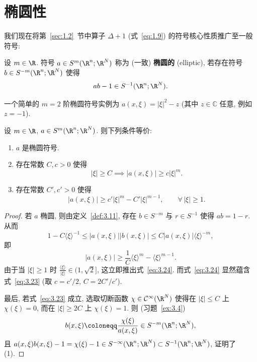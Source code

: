 \section{椭圆性}\label{sec:3.2}
%

我们现在将第~\ref{sec:1.2}~节中算子 $\Delta + 1$ (式~\eqref{eq:1.9}) 的符号核心性质推广至一般符号:

\begin{definition}[椭圆符号]\label{def:3.11}
设 $m \in \R$. 符号 $a \in S^m(\R^n; \R^N)$ 称为 (一致) \textbf{椭圆的} (elliptic), 若存在符号 $b \in S^{-m}(\R^n; \R^N)$ 使得
\[
    a b - 1 \in S^{-1}(\R^n; \R^N).
\]
\end{definition}

一个简单的 $m = 2$ 阶椭圆符号实例为 $a(x, \xi) = |\xi|^2 - z$ (其中 $z \in \mathbb{C}$ 任意, 例如 $z = -1$).

\begin{proposition}[椭圆性的等价刻画]\label{prop:3.12}
设 $m \in \R$, $a \in S^m(\R^n; \R^N)$. 则下列条件等价:
\begin{enumerate}
    \item $a$ 是椭圆符号.
    \item 存在常数 $C, c > 0$ 使得
    \begin{equation}\label{eq:3.23}
        |\xi| \ge C \implies |a(x, \xi)| \ge c |\xi|^m.
    \end{equation}
    \item 存在常数 $C', c' > 0$ 使得
    \begin{equation}\label{eq:3.24}
        |a(x, \xi)| \ge c' |\xi|^m - C' |\xi|^{m-1}, \qquad \forall\,|\xi| \ge 1.
    \end{equation}
\end{enumerate}
\end{proposition}

\begin{proof}
若 $a$ 椭圆, 则由定义~\ref{def:3.11}, 存在 $b \in S^{-m}$ 与 $r \in S^{-1}$ 使得 $a b = 1 - r$. 从而
\begin{equation}\label{eq:3.25}
    1 - C \langle \xi \rangle^{-1} \le |a(x, \xi)| |b(x, \xi)| \le C |a(x, \xi)| \langle \xi \rangle^{-m},
\end{equation}
即
\begin{equation}\label{eq:3.26}
    |a(x, \xi)| \ge \frac{1}{C} \langle \xi \rangle^m - \langle \xi \rangle^{m-1}.
\end{equation}
由于当 $|\xi| \ge 1$ 时 $\frac{\langle \xi \rangle}{|\xi|} \in (1, \sqrt{2}]$, 这立即推出式~\eqref{eq:3.24}. 而式~\eqref{eq:3.24} 显然蕴含式~\eqref{eq:3.23} (取 $c = c'/2$, $C = 2C'/c'$).

最后, 若式~\eqref{eq:3.23} 成立, 选取切断函数 $\chi \in \Smooth(\R^N)$ 使得在 $|\xi| \le C$ 上 $\chi(\xi) = 0$, 而在 $|\xi| \ge 2C$ 上 $\chi(\xi) = 1$. 则 (习题~\ref{ex:3.4})
\begin{equation}\label{eq:3.27}
    b(x, \xi) \defeq \frac{\chi(\xi)}{a(x, \xi)} \in S^{-m}(\R^n; \R^N),
\end{equation}
且 $a(x, \xi) b(x, \xi) - 1 = \chi(\xi) - 1 \in S^{-\infty}(\R^n; \R^N) \subset S^{-1}(\R^n; \R^N)$, 证明了 (1).
\end{proof}

